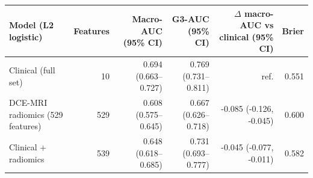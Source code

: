 \begin{tabular}{lrrrrr}
\toprule
Model (L2 logistic) & Features & Macro-AUC (95\% CI) & G3-AUC (95\% CI) & $\Delta$ macro-AUC vs clinical (95\% CI) & Brier \\
\midrule
Clinical (full set) & 10 & 0.694 (0.663--0.727) & 0.769 (0.731--0.811) & ref. & 0.551 \\
DCE-MRI radiomics (529 features) & 529 & 0.608 (0.575--0.645) & 0.667 (0.626--0.718) & -0.085 (-0.126, -0.045) & 0.600 \\
Clinical + radiomics & 539 & 0.648 (0.618--0.685) & 0.731 (0.693--0.777) & -0.045 (-0.077, -0.011) & 0.582 \\
\bottomrule
\end{tabular}